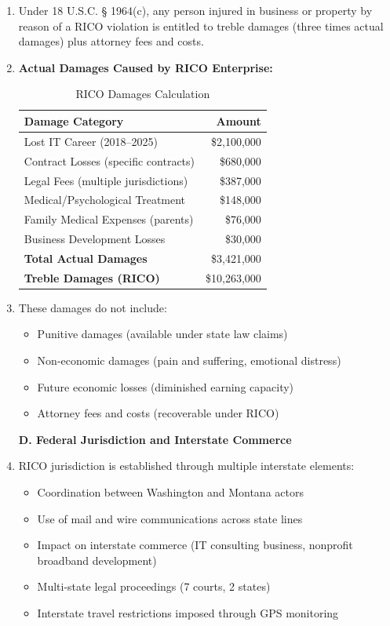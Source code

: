 \documentclass[12pt,letterpaper]{article}
\begin{document}
\begin{enumerate}
\textbf{C. RICO Damages}

\item Under 18 U.S.C. § 1964(c), any person injured in business or property by reason of a RICO violation is entitled to treble damages (three times actual damages) plus attorney fees and costs.

\item \textbf{Actual Damages Caused by RICO Enterprise:}

\begin{table}[h]
\begin{tabular}{|l|r|}
\hline
\textbf{Damage Category} & \textbf{Amount} \\
\hline
Lost IT Career (2018--2025) & \$2,100,000 \\
Contract Losses (specific contracts) & \$680,000 \\
Legal Fees (multiple jurisdictions) & \$387,000 \\
Medical/Psychological Treatment & \$148,000 \\
Family Medical Expenses (parents) & \$76,000 \\
Business Development Losses & \$30,000 \\
\hline
\textbf{Total Actual Damages} & \$3,421,000 \\
\hline
\textbf{Treble Damages (RICO)} & \$10,263,000 \\
\hline
\end{tabular}
\caption{RICO Damages Calculation}
\end{table}

\item These damages do not include:

\begin{itemize}
\item Punitive damages (available under state law claims)
\item Non-economic damages (pain and suffering, emotional distress)
\item Future economic losses (diminished earning capacity)
\item Attorney fees and costs (recoverable under RICO)
\end{itemize}

\textbf{D. Federal Jurisdiction and Interstate Commerce}

\item RICO jurisdiction is established through multiple interstate elements:

\begin{itemize}
\item Coordination between Washington and Montana actors
\item Use of mail and wire communications across state lines
\item Impact on interstate commerce (IT consulting business, nonprofit broadband development)
\item Multi-state legal proceedings (7 courts, 2 states)
\item Interstate travel restrictions imposed through GPS monitoring
\end{itemize}


\end{enumerate}
\end{document}
